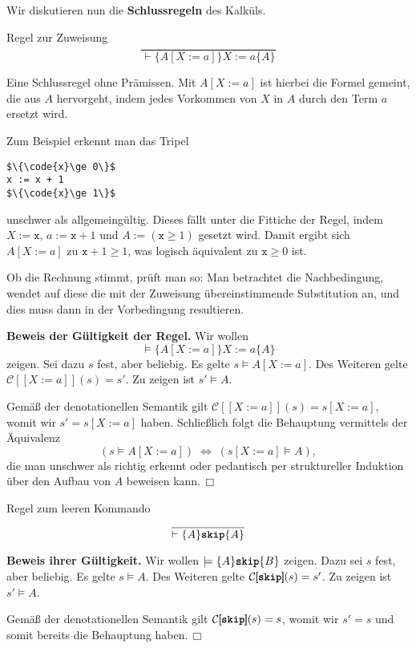 \documentclass[8pt,fleqn,aspectratio=169]{beamer}
\newcommand{\strong}[1]{\textsf{\textbf{#1}}}
\renewcommand{\qedsymbol}{\ensuremath{\Box}}
\newcommand{\parspace}{\vspace{0.8em}}
\newcommand{\kw}[1]{\textbf{\texttt{#1}}}
\newcommand{\code}[1]{{\texttt{#1}}}
\newcommand{\qb}[1]{[\!\![#1]\!\!]}
\newcommand{\evC}{\mathcal C}
\begin{document}
\begin{frame}[fragile]
Wir diskutieren nun die \strong{Schlussregeln} des Kalküls.\pause

\parspace
\begin{block}{Regel zur Zuweisung}
\[\dfrac{}{\vdash\{A[X:=a]\}X:=a\{A\}}\]
\end{block}
Eine Schlussregel ohne Prämissen. Mit $A[X:=a]$ ist hierbei die
Formel gemeint, die aus $A$ hervorgeht, indem jedes Vorkommen von
$X$ in $A$ durch den Term $a$ ersetzt wird.\pause

\parspace
Zum Beispiel erkennt man das Tripel
\begin{lstlisting}[language=IMP, xleftmargin=\mathindent, mathescape]
$\{\code{x}\ge 0\}$
x := x + 1
$\{\code{x}\ge 1\}$
\end{lstlisting}
unschwer als allgemeingültig. Dieses fällt unter die Fittiche der
Regel, indem $X:=\code{x}$, $a:=\code{x}+1$ und $A:=(\code{x}\ge 1)$
gesetzt wird. Damit ergibt sich $A[X:=a]$ zu $\code{x} + 1\ge 1$,
was logisch äquivalent zu $\code{x}\ge 0$ ist.
\end{frame}

\begin{frame}
Ob die Rechnung stimmt, prüft man so: Man betrachtet die Nachbedingung,
wendet auf diese die mit der Zuweisung übereinstimmende Substitution an,
und dies muss dann in der Vorbedingung resultieren.\pause

\parspace
\strong{Beweis der Gültigkeit der Regel.} Wir wollen
\[\models\{A[X:=a]\}X:=a\{A\}\]
zeigen.\pause{} Sei dazu $s$ fest, aber beliebig. Es gelte $s\models A[X:=a]$.
Des Weiteren gelte $\evC\qb{X:=a}(s)=s'$. Zu zeigen ist $s'\models A$.\pause

\parspace
Gemäß der denotationellen Semantik gilt $\evC\qb{X:=a}(s)=s[X:=a]$, womit
wir $s'=s[X:=a]$ haben. Schließlich folgt die Behauptung vermittels
der Äquivalenz
\[(s\models A[X:=a])\;\Leftrightarrow\; (s[X:=a]\models A),\]
die man unschwer als richtig erkennt oder pedantisch per struktureller
Induktion über den Aufbau von $A$ beweisen kann.\,\qedsymbol
\end{frame}

\begin{frame}
\begin{block}{Regel zum leeren Kommando}
\[\dfrac{}{\vdash\{A\}\kw{skip}\{A\}}\]
\end{block}\pause
\strong{Beweis ihrer Gültigkeit.}
Wir wollen $\models\{A\}\kw{skip}\{B\}$ zeigen.
Dazu sei $s$ fest, aber beliebig. Es gelte $s\models A$. Des Weiteren
gelte $\evC\qb{\kw{skip}}(s)=s'$. Zu zeigen ist $s'\models A$.\pause

\parspace
Gemäß der denotationellen Semantik gilt $\evC\qb{\kw{skip}}(s)=s$, womit
wir $s'=s$ und somit bereits die Behauptung haben.\,\qedsymbol
\end{frame}
\end{document}

